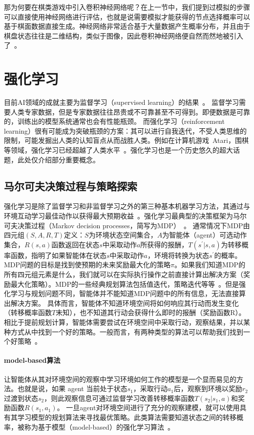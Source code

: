 那为何要在棋类游戏中引入卷积神经网络呢？在上一节中，我们提到过模拟的步骤可以直接使用神经网络进行评估，也就是说需要模拟才能获得的节点选择概率可以基于棋面数据直接生成。神经网络非常适合基于大量数据产生概率分布，并且由于棋盘状态往往是二维结构，类似于图像，因此卷积神经网络便自然而然地被引入了~\cite{Silver1140,Silver2017,Silver2016}。

\section{强化学习}
目前AI领域的成就主要为监督学习（supervised learning）的结果~\cite{NIPS2012_4824,resnet,hastie2009elements,lecun2015deep}。
监督学习需要人类专家数据，但是专家数据往往昂贵或不可靠甚至不可得到。即便数据是可靠的，训练出的模型系统通常也会有性能瓶颈。
而强化学习（reinforcement learning）很有可能成为突破瓶颈的方案：其可以进行自我迭代，不受人类思维的限制，可能发掘出人类的认知盲点从而战胜人类。例如在计算机游戏~Atari，围棋等领域，强化学习已经超越了人类水平~\cite{Silver2016}。强化学习也是一个历史悠久的超大话题，此处仅介绍部分重要概念。
\subsection{马尔可夫决策过程与策略探索}
强化学习是除了监督学习和非监督学习之外的第三种基本机器学习方法，其通过与环境互动学习最佳动作以获得最大预期收益~\cite{Sutton1998}。强化学习最典型的决策框架为马尔可夫决策过程（Markov decision processes，简写为MDP）~\cite{Bel}。
通常情况下MDP由四元组$(S,A,R,T)$定义：$S$为环境状态空间集合，$A$为智能体（agent）可选动作集合，$R(s,a)$函数返回在状态$s$中采取动作$a$所获得的报酬，$T(s^{\prime}|s,a)$为转移概率函数，指明了如果智能体在状态$s$中采取动作$a$，环境将转换为状态$s^{\prime}$的概率。
MDP问题的目标是找到使预期的未来奖励最大化的策略$\pi$。如果我们知道MDP的所有四元组元素是什么，我们就可以在实际执行操作之前直接计算出解决方案（奖励最大化策略）。MDP的一些经典规划算法包括值迭代，策略迭代等等~\cite{Sutton1998}。但是强化学习与规划问题不同，智能体并不能知道MDP问题中的所有信息，无法直接算出解决方案。
具体而言，智能体不知道环境空间将如何响应其行动而发生变化（转移概率函数$T$未知），也不知道其行动会获得什么即时的报酬（奖励函数R）。相比于提前规划计算，智能体需要尝试在环境空间中采取行动，观察结果，并以某种方式从中找到一个好的策略。一般而言，有两种类型的算法可以帮助我们找到一个好策略~\cite{rlbase}。

\paragraph{model-based算法}
让智能体从其对环境空间的观察中学习环境如何工作的模型是一个显而易见的方法。也就是说，如果 agent 当前处于状态$s_{1}$，采取行动$a_{1}$后，观察到环境以奖励$r_{2}$过渡到状态$s_{2}$，则此观察信息可通过监督学习改善转移概率函数$T(s_{2}|s_{1},a)$和奖励函数$R(s_{1},a_{1})$。
一旦agent对环境空间进行了充分的观察建模，就可以使用具有其学习模型的规划算法来寻找最优策略。此类算法需要知道状态之间的转移概率，被称为基于模型（model-based）的强化学习算法~\cite{moerland2021modelbased,606886,10.1162/089976602753712972}。
